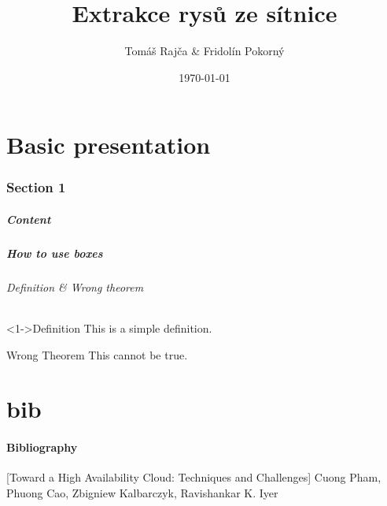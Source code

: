 \documentclass[compress]{beamer}
\begin{document}
\title{Extrakce rysů ze sítnice}
\author{Tomáš Rajča \& Fridolín Pokorný}
\date{\today}


\begin{frame}[plain]
  \titlepage
\end{frame}

\part{Basic presentation}
\frame{\partpage}

\section{Section 1}

\begin{frame}
  \frametitle{Content}
  \tableofcontents
\end{frame}


\begin{frame}
  \frametitle{How to use boxes}
  \framesubtitle{Definition \& Wrong theorem}

  \begin{block}<1->{Definition}
    This is a simple definition.
  \end{block}

  \begin{alertblock}{Wrong Theorem}
    This \alert{cannot} be true.
  \end{alertblock}
\end{frame}


\part{bib}
\subsection{Bibliography}
\begin{frame}
\begin{thebibliography}{10}
  [Toward a High Availability Cloud: Techniques and Challenges]
  \newblock Cuong Pham, Phuong Cao, Zbigniew Kalbarczyk, Ravishankar K. Iyer

\end{thebibliography}
\end{frame}
\end{document}

